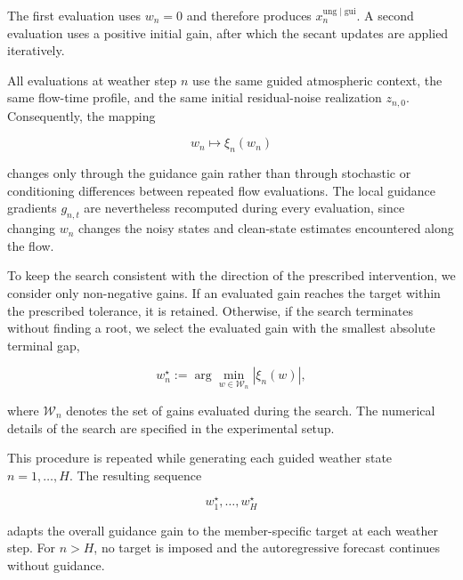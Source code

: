 The first evaluation uses $w_n=0$ and therefore produces
$x_n^{\mathrm{ung}\mid\mathrm{gui}}$. A second evaluation uses a positive
initial gain, after which the secant updates are applied iteratively.

All evaluations at weather step $n$ use the same guided atmospheric context,
the same flow-time profile, and the same initial residual-noise realization
$z_{n,0}$. Consequently, the mapping

\[
    w_n
    \longmapsto
    \xi_n(w_n)
\]

changes only through the guidance gain rather than through stochastic or
conditioning differences between repeated flow evaluations. The local
guidance gradients $g_{n,t}$ are nevertheless recomputed during every
evaluation, since changing $w_n$ changes the noisy states and clean-state
estimates encountered along the flow.

To keep the search consistent with the direction of the prescribed
intervention, we consider only non-negative gains. If an evaluated gain reaches
the target within the prescribed tolerance, it is retained. Otherwise, if the
search terminates without finding a root, we select the evaluated gain with
the smallest absolute terminal gap,

\begin{equation}
    w_n^\star
    :=
    \arg\min_{w\in\mathcal{W}_n}
    \left|
        \xi_n(w)
    \right|,
    \label{eq:best-evaluated-gain}
\end{equation}

where $\mathcal{W}_n$ denotes the set of gains evaluated during the search.
The numerical details of the search are specified in the experimental setup.

This procedure is repeated while generating each guided weather state
$n=1,\ldots,H$. The resulting sequence

\[
    w_1^\star,\ldots,w_H^\star
\]

adapts the overall guidance gain to the member-specific target at each weather
step. For $n>H$, no target is imposed and the autoregressive forecast continues
without guidance.
